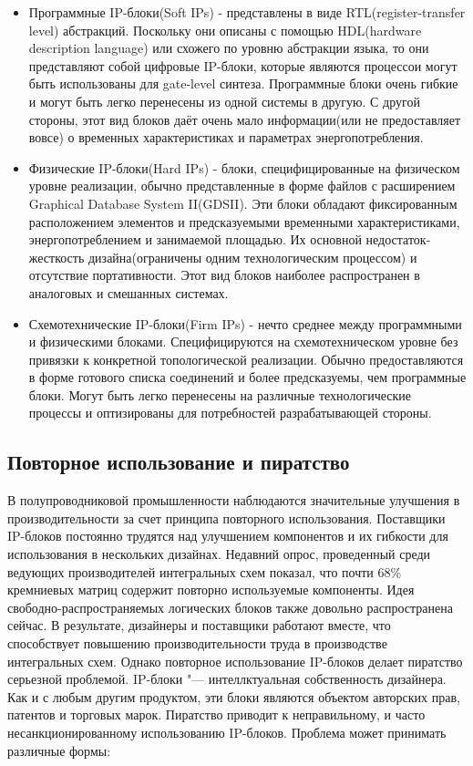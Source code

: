 \begin{itemize}
  \item Программные IP-блоки(Soft IPs) - представлены в виде RTL(register-transfer level) абстракций. Поскольку они описаны с помощью HDL(hardware description language) или схожего по уровню абстракции языка, то они представляют собой цифровые IP-блоки, которые являются процессо и могут быть использованы для gate-level синтеза. Программные блоки очень гибкие и могут быть легко перенесены из одной системы в другую. С другой стороны, этот вид блоков даёт очень мало информации(или не предоставляет вовсе) о временных характеристиках и параметрах энергопотребления.
  \item Физические IP-блоки(Hard IPs) - блоки, специфицированные на физическом уровне реализации, обычно представленные в форме файлов с расширением Graphical Database System II(GDSII). Эти блоки обладают фиксированным расположением элементов и предсказуемыми временными характеристиками, энергопотреблением и занимаемой площадью. Их основной недостаток- жесткость дизайна(ограничены одним технологическим процессом) и отсутствие портативности. Этот вид блоков наиболее распространен в аналоговых и смешанных системах.
  \item Схемотехнические IP-блоки(Firm IPs) - нечто среднее между программными и физическими блоками. Специфицируются на схемотехническом уровне без привязки к конкретной топологической реализации. Обычно предоставляются в форме готового списка соединений и более предсказуемы, чем программные блоки. Могут быть легко перенесены на различные технологические процессы и оптизированы для потребностей разрабатывающей стороны.
\end{itemize}


\subsection{Повторное использование и пиратство}
\label{page:domain:piracy}
В полупроводниковой промышленности наблюдаются значительные улучшения в производительности за счет принципа повторного использования. Поставщики IP-блоков постоянно трудятся над улучшением компонентов и их гибкости для использования в нескольких дизайнах. Недавний опрос, проведенный среди ведующих производителей интегральных схем показал, что почти 68\% кремниевых матриц содержит повторно используемые компоненты\cite{design_and_verification_report_2013}. Идея свободно-распространяемых логических блоков также довольно распространена сейчас. В результате, дизайнеры и поставщики работают вместе, что способствует повышению производительности труда в производстве интегральных схем. Однако повторное использование IP-блоков делает пиратство серьезной проблемой. IP-блоки "--- интеллктуальная собственность дизайнера. Как и с любым другим продуктом, эти блоки являются объектом авторских прав, патентов и торговых марок. Пиратство приводит к неправильному, и часто несанкционированному использованию IP-блоков. Проблема может принимать различные формы:

